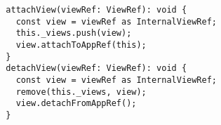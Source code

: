 \begin{verbatim}
  attachView(viewRef: ViewRef): void {
    const view = viewRef as InternalViewRef;
    this._views.push(view);
    view.attachToAppRef(this);
  }
  detachView(viewRef: ViewRef): void {
    const view = viewRef as InternalViewRef;
    remove(this._views, view);
    view.detachFromAppRef();
  }
\end{verbatim}
